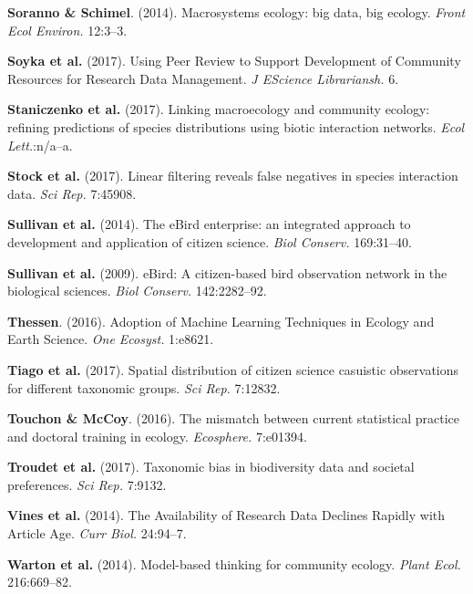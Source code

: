 \documentclass[12pt]{article}
\begin{document}
\leavevmode\hypertarget{ref-SoraSchi14}{}%
\textbf{Soranno \& Schimel}. (2014). Macrosystems ecology: big data, big
ecology. \emph{Front Ecol Environ.} 12:3--3.

\leavevmode\hypertarget{ref-SoykBudd17}{}%
\textbf{Soyka et al.} (2017). Using Peer Review to Support Development
of Community Resources for Research Data Management. \emph{J EScience
Librariansh.} 6.

\leavevmode\hypertarget{ref-StanSiva17}{}%
\textbf{Staniczenko et al.} (2017). Linking macroecology and community
ecology: refining predictions of species distributions using biotic
interaction networks. \emph{Ecol Lett.}:n/a--a.

\leavevmode\hypertarget{ref-StocPois17}{}%
\textbf{Stock et al.} (2017). Linear filtering reveals false negatives
in species interaction data. \emph{Sci Rep.} 7:45908.

\leavevmode\hypertarget{ref-SullAycr14}{}%
\textbf{Sullivan et al.} (2014). The eBird enterprise: an integrated
approach to development and application of citizen science. \emph{Biol
Conserv.} 169:31--40.

\leavevmode\hypertarget{ref-SullWood09}{}%
\textbf{Sullivan et al.} (2009). eBird: A citizen-based bird observation
network in the biological sciences. \emph{Biol Conserv.} 142:2282--92.

\leavevmode\hypertarget{ref-Thes16}{}%
\textbf{Thessen}. (2016). Adoption of Machine Learning Techniques in
Ecology and Earth Science. \emph{One Ecosyst.} 1:e8621.

\leavevmode\hypertarget{ref-TiagCeia17}{}%
\textbf{Tiago et al.} (2017). Spatial distribution of citizen science
casuistic observations for different taxonomic groups. \emph{Sci Rep.}
7:12832.

\leavevmode\hypertarget{ref-ToucMcCo16}{}%
\textbf{Touchon \& McCoy}. (2016). The mismatch between current
statistical practice and doctoral training in ecology. \emph{Ecosphere.}
7:e01394.

\leavevmode\hypertarget{ref-TrouGran17}{}%
\textbf{Troudet et al.} (2017). Taxonomic bias in biodiversity data and
societal preferences. \emph{Sci Rep.} 7:9132.

\leavevmode\hypertarget{ref-VineAlbe14}{}%
\textbf{Vines et al.} (2014). The Availability of Research Data Declines
Rapidly with Article Age. \emph{Curr Biol.} 24:94--7.

\leavevmode\hypertarget{ref-WartFost14}{}%
\textbf{Warton et al.} (2014). Model-based thinking for community
ecology. \emph{Plant Ecol.} 216:669--82.
\end{document}
